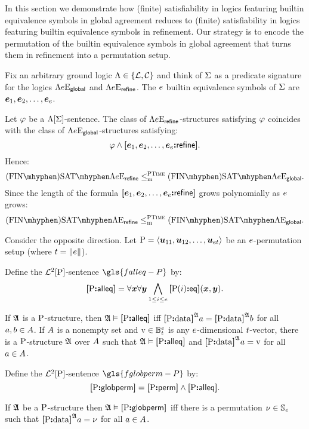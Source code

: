 
In this section we demonstrate how (finite) satisfiability in logics featuring
builtin equivalence symbols in global agreement reduces to (finite)
satisfiability in logics featuring builtin equivalence symbols in refinement.
Our strategy is to encode the permutation of the builtin equivalence symbols in
global agreement that turns them in refinement into a permutation setup.

Fix an arbitrary ground logic $\Lambda \in \left\{\mathcal{L}, \mathcal{C}\right\}$ and think of $\mathrm{\Sigma}$ as
a predicate signature for the logics $\Lambda{e}\mathrm{E}_{\mathsf{global}}$ and
$\Lambda{e}\mathrm{E}_{\mathsf{refine}}$. The $e$ builtin equivalence symbols of $\mathrm{\Sigma}$ are
$\bm{e}_{1}, \bm{e}_{2}, \dots, \bm{e}_{e}$.

Let $\varphi$ be a  $\Lambda[\mathrm{\Sigma}]$-sentence.
The class of $\Lambda{e}\mathrm{E}_{\mathsf{refine}}$-structures satisfying $\varphi$ coincides
with the class of $\Lambda{e}\mathrm{E}_{\mathsf{global}}$-structures satisfying:
\[
  \varphi \land {\bm{[}\bm{e}_{1},\bm{e}_{2},\dots,\bm{e}_{e}\mathord{\bm{:}}\mathsf{refine}\bm{]}}.
\]
Hence:
\[
  \FinASat\aL\Eea\sze\agrefine \red\cP \FinASat\aL\Eea\sze\agglobal.
\]
Since the length of the formula ${\bm{[}\bm{e}_{1},\bm{e}_{2},\dots,\bm{e}_{e}\mathord{\bm{:}}\mathsf{refine}\bm{]}}$ grows
polynomially as $e$ grows:
\[
  \FinASat\aL\Eea\nosze\agrefine \red\cP \FinASat\aL\Eea\nosze\agglobal.
\]

Consider the opposite direction.
Let ${\mathrm{P}} = \left\langle \bm{u}_{11}, \bm{u}_{12}, \dots, \bm{u}_{et} \right\rangle$ be an
$e$-permutation setup (where $t = \|e\|$).
\begin{definition}
Define the $\mathcal{L}^{2}[{\mathrm{P}}]$-sentence $\gls{falleq-P}$ by:
\[
  {\bm{[}{\mathrm{P}}\mathord{\bm{:}}\mathsf{alleq}\bm{]}} = \forall\bm{x} \forall\bm{y} \bigwedge_{1 \leq i \leq e}
  {\bm{[}{\mathrm{P}}(i)\mathord{\bm{:}}\mathsf{eq}\bm{]}}(\bm{x},\bm{y}).
\]
\end{definition}
If $\mathfrak{A}$ is a ${\mathrm{P}}$-structure, then $\mathfrak{A} \vDash {\bm{[}{\mathrm{P}}\mathord{\bm{:}}\mathsf{alleq}\bm{]}}$ iff
${\bm{[}{\mathrm{P}}\mathord{\bm{:}}\mathrm{data}\bm{]}}^{\mathfrak{A}}a = {\bm{[}{\mathrm{P}}\mathord{\bm{:}}\mathrm{data}\bm{]}}^{\mathfrak{A}}b$ for all $a, b \in A$.
If $A$ is a nonempty set and $\mathrm{v} \in \mathbb{B}_{t}^{e}$ is any
$e$-dimensional $t$-vector, there is a ${\mathrm{P}}$-structure $\mathfrak{A}$ over
$A$ such that $\mathfrak{A} \vDash {\bm{[}{\mathrm{P}}\mathord{\bm{:}}\mathsf{alleq}\bm{]}}$ and
${\bm{[}{\mathrm{P}}\mathord{\bm{:}}\mathrm{data}\bm{]}}^{\mathfrak{A}}a = \mathrm{v}$ for all $a \in A$.

\begin{definition}
Define the $\mathcal{L}^{2}[{\mathrm{P}}]$-sentence $\gls{fglobperm-P}$ by:
\[
  {\bm{[}{\mathrm{P}}\mathord{\bm{:}}\mathsf{globperm}\bm{]}} = {\bm{[}{\mathrm{P}}\mathord{\bm{:}}\mathsf{perm}\bm{]}} \land {\bm{[}{\mathrm{P}}\mathord{\bm{:}}\mathsf{alleq}\bm{]}}.
\]
\end{definition}
If $\mathfrak{A}$ be a ${\mathrm{P}}$-structure then $\mathfrak{A} \vDash {\bm{[}{\mathrm{P}}\mathord{\bm{:}}\mathsf{globperm}\bm{]}}$ iff there
is a permutation $\nu \in \mathbb{S}_{e}$ such that
${\bm{[}{\mathrm{P}}\mathord{\bm{:}}\mathrm{data}\bm{]}}^{\mathfrak{A}}a = \nu$ for all $a \in A$.

